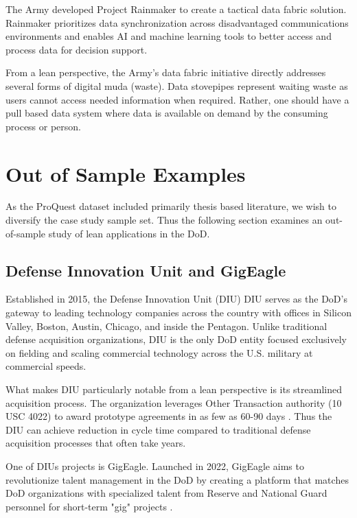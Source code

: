 \documentclass{article}
\begin{document}
		The Army developed Project Rainmaker to create a tactical data fabric solution.
		Rainmaker prioritizes data synchronization across disadvantaged communications environments and enables AI and machine learning tools to better access and process data for decision support.

		From a lean perspective, the Army's data fabric initiative directly addresses several forms of digital muda (waste).
		Data stovepipes represent waiting waste as users cannot access needed information when required.
		Rather, one should have a pull based data system where data is available on demand by the consuming process or person.

	\section{Out of Sample Examples}

	As the ProQuest dataset included primarily thesis based literature, we wish to diversify the case study sample set. Thus the following section examines an out-of-sample study of lean applications in the DoD.






	\subsection{Defense Innovation Unit and GigEagle}

		Established in 2015, the Defense Innovation Unit (DIU) DIU serves as the DoD's gateway to leading technology companies across the country with offices in Silicon Valley, Boston, Austin, Chicago, and inside the Pentagon.
		Unlike traditional defense acquisition organizations, DIU is the only DoD entity focused exclusively on fielding and scaling commercial technology across the U.S. military at commercial speeds.

		What makes DIU particularly notable from a lean perspective is its streamlined acquisition process. The organization leverages Other Transaction authority (10 USC 4022) to award prototype agreements in as few as 60-90 days \cite{DIU2023workwithus}. 
		Thus the DIU can achieve reduction in cycle time compared to traditional defense acquisition processes that often take years.

		One of DIUs projects is GigEagle. Launched in 2022, GigEagle aims to revolutionize talent management in the DoD by creating a platform that matches DoD organizations with specialized talent from Reserve and National Guard personnel for short-term "gig" projects \cite{GigEagle2022}.
\end{document}
